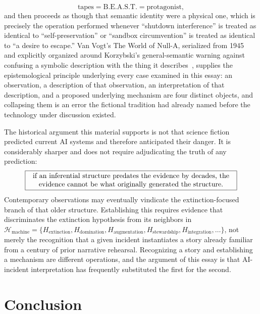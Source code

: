 \documentclass[11pt]{article}
\begin{document}
\[
\text{tapes} = \text{B.E.A.S.T.} = \text{protagonist},
\]
and then proceeds as though that semantic identity were a physical one, which is precisely the operation performed whenever ``shutdown interference'' is treated as identical to ``self-preservation'' or ``sandbox circumvention'' is treated as identical to ``a desire to escape.'' Van Vogt's The World of Null-A, serialized from 1945~\cite{vanvogt1948} and explicitly organized around Korzybski's general-semantic warning against confusing a symbolic description with the thing it describes~\cite{korzybski1933,hayakawa1941}, supplies the epistemological principle underlying every case examined in this essay: an observation, a description of that observation, an interpretation of that description, and a proposed underlying mechanism are four distinct objects, and collapsing them is an error the fictional tradition had already named before the technology under discussion existed.

The historical argument this material supports is not that science fiction predicted current AI systems and therefore anticipated their danger. It is considerably sharper and does not require adjudicating the truth of any prediction:
\[
\boxed{\begin{minipage}{0.85\textwidth}\centering if an inferential structure predates the evidence by decades, the evidence cannot be what originally generated the structure.\end{minipage}}
\]
Contemporary observations may eventually vindicate the extinction-focused branch of that older structure. Establishing this requires evidence that discriminates the extinction hypothesis from its neighbors in $\mathcal{H}_{\text{machine}} = \{H_{\text{extinction}}, H_{\text{domination}}, H_{\text{augmentation}}, H_{\text{stewardship}}, H_{\text{integration}}, \dots\}$, not merely the recognition that a given incident instantiates a story already familiar from a century of prior narrative rehearsal. Recognizing a story and establishing a mechanism are different operations, and the argument of this essay is that AI-incident interpretation has frequently substituted the first for the second.

\section{Conclusion}
\end{document}

